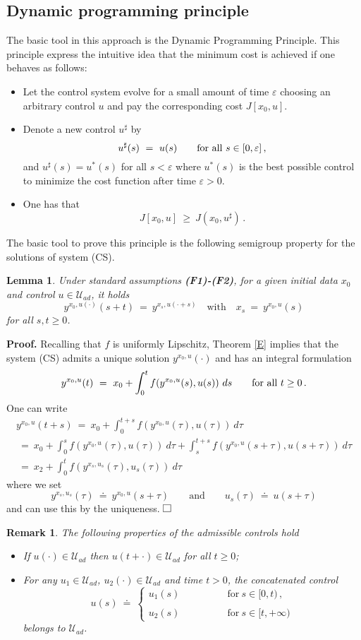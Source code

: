 \documentclass[letterpaper,12pt]{article}
\numberwithin{equation}{section}
\newcommand{\qed}{\hfill$\square$\vspace{0.3truecm}}
\def\forall{\hbox{for all}~}
\def\ve{\varepsilon}
\def\sqr#1#2{\vbox{\hrule height .#2pt
\hbox{\vrule width .#2pt height #1pt \kern #1pt
\vrule width .#2pt}\hrule height .#2pt }}
\def\square{\sqr74}
\newtheorem{remark}[theorem]{Remark}
\newtheorem{lemma}[theorem]{Lemma}
\begin{document}
\subsection{Dynamic programming principle}
The basic tool in this approach is the Dynamic Programming Principle. This principle express the
intuitive idea that the minimum cost is achieved if one behaves as follows:
\begin{itemize}
\item Let the control system evolve for a small amount of time $\ve$ choosing an arbitrary control $u$ and pay the corresponding cost $J[x_0,u]$.
\item Denote a new control $u^{\sharp}$ by 
\[
u^{\sharp}(s)~=~u(s)\qquad\forall s\in [0,\ve]\,,
\]
and $u^{\sharp}(s)=u^*(s)$ for all $s<\ve$ where $u^*(s)$ is the best possible control to minimize the cost function after time $\ve>0$.
\item One has that 
\[
J[x_0,u]~\geq~J(x_0,u^{\sharp})\,.
\]
\end{itemize}
The basic tool to prove this principle is the following semigroup property for the solutions of
system (CS).
\begin{lemma}\label{Concate} Under standard assumptions {\bf (F1)-(F2)}, for a given initial data $x_0$ and control $u\in\mathcal{U}_{ad}$, it holds
\[
y^{x_0,u(\cdot)}(s+t)~=~y^{x_s, u(\cdot+s)}\quad\mathrm{with}\quad x_s~=~y^{x_0,u}(s)
\]
for all $s,t\geq 0$.
\end{lemma}
{\bf Proof.} Recalling that $f$ is uniformly Lipschitz, Theorem \ref{E} implies that the system (CS) admits a unique solution $y^{x_0,u}(\cdot)$ and has an integral formulation
\[
y^{x_0,u}(t)~=~x_0+\int_{0}^tf(y^{x_0,u}(s),u(s))~ds\qquad\forall t\geq 0\,.
\]
One can write 
\begin{multline*}
y^{x_0,u}(t+s)~=~x_0+\int_{0}^{t+s}f(y^{x_0,u}(\tau),u(\tau))~d\tau\\
~=~x_0+\int_{0}^{s}f(y^{x_0,u}(\tau),u(\tau))~d\tau+\int_{s}^{t+s}f(y^{x_0,u}(s+\tau),u(s+\tau))~d\tau\\
~=~x_2+\int_{0}^tf(y^{x_s,u_s}(\tau),u_s(\tau))~d\tau
\end{multline*}
where we set 
\[
y^{x_s,u_s}(\tau)~\doteq~y^{x_0,u}(s+\tau)\qquad\mathrm{and}\qquad u_s(\tau)~\doteq~u(s+\tau)
\]
and can use this by the uniqueness.
\qed
\begin{remark} The following properties of the admissible controls hold
\begin{itemize}
\item [(i)] If  $u(\cdot)\in\mathcal{U}_{ad}$ then $u(t+\cdot)\in\mathcal{U}_{ad}$ for all $t\geq 0$;
\item [(ii)] For any $u_1\in\mathcal{U}_{ad}$, $u_2(\cdot)\in\mathcal{U}_{ad}$ and time $t>0$, the concatenated control 
\[
u(s)~\doteq~ \left\{\begin{array}{ll}
u_1(s)\qquad&\qquad\mathrm{for}~s\in [0,t)\,,\\
\\
u_2(s)\qquad&\qquad\mathrm{for}~s\in [t,+\infty)
\end{array}\right.
\]
belongs to $\mathcal{U}_{ad}$.
\end{itemize}
\end{remark}
\end{document}
